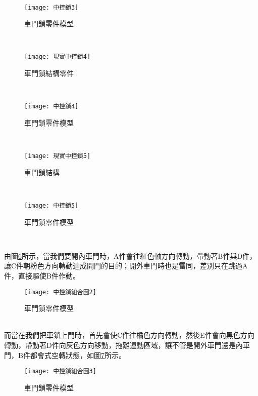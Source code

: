 \\
\begin{figure}[hbt!]
\begin{center}
\texttt{[image: 中控鎖3]}
\caption{\Large 車門鎖零件模型}\label{4.8}
\end{center}
\end{figure}
\\
\begin{figure}[hbt!]
\begin{center}
\texttt{[image: 現實中控鎖4]}
\caption{\Large 車門鎖結構零件}\label{4.4}
\end{center}
\end{figure}
\\
\begin{figure}[hbt!]
\begin{center}
\texttt{[image: 中控鎖4]}
\caption{\Large 車門鎖零件模型}\label{4.9}
\end{center}
\end{figure}
\\
\begin{figure}[hbt!]
\begin{center}
\texttt{[image: 現實中控鎖5]}
\caption{\Large 車門鎖結構}\label{4.5}
\end{center}
\end{figure}
\\
\begin{figure}[hbt!]
\begin{center}
\texttt{[image: 中控鎖5]}
\caption{\Large 車門鎖零件模型}\label{4.10}
\end{center}
\end{figure}
\\

\newpage

\newpage

由圖\ref{4.11}所示，當我們要開內車門時，A件會往紅色軸方向轉動，帶動著B件與D件，讓C件朝粉色方向轉動達成開門的目的；開外車門時也是雷同，差別只在跳過A件，直接驅使B件作動。\\
\begin{figure}[hbt!]
\begin{center}
\texttt{[image: 中控鎖組合圖2]}
\caption{\Large 車門鎖零件模型}\label{4.11}
\end{center}
\end{figure}
\\

而當在我們把車鎖上門時，首先會使C件往橘色方向轉動，然後E件會向黑色方向轉動，帶動著D件向灰色方向移動，拖離運動區域，讓不管是開外車門還是內車門，B件都會式空轉狀態，如圖\ref{4.12}所示。\\
\begin{figure}[hbt!]
\begin{center}
\texttt{[image: 中控鎖組合圖3]}
\caption{\Large 車門鎖零件模型}\label{4.12}
\end{center}
\end{figure}
\\


